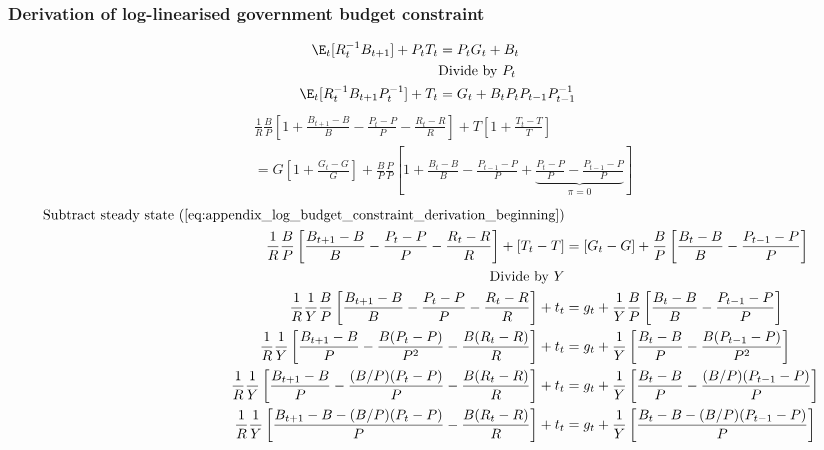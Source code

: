 \subsubsection{Derivation of log-linearised government budget constraint}
\begin{align} \label{eq:appendix_log_budget_constraint_derivation_beginning}
    \E_t [R^{-1}_tB_{t+1}] + P_t T_t &= P_tG_t + B_t\\
    &\text{Divide by $P_t$} \nonumber\\
    \E_t [R^{-1}_tB_{t+1}P_t^{-1}] + T_t &= G_t + B_tP_t P_{t-1} P^{-1}_{t-1}
\end{align} 
\begin{align}   
    &\frac{1}{R}\frac{B}{P}\left[ 1 + \frac{B_{t+1}-B}{B} - \frac{P_t - P}{P} - \frac{R_t-R}{R}\right] + T\left[ 1 + \frac{T_t - T}{T} \right] \nonumber \\ 
    &= G\left[ 1 + \frac{G_t - G}{G} \right] + \frac{B}{P} \frac{P}{P} \left[ 1 + \frac{B_t - B}{B} - \frac{P_{t-1} - P}{P} + \underbrace{\frac{P_{t} - P}{P} - \frac{P_{t-1} - P}{P}}_{\pi = 0}\right]
\end{align}
\begin{align}
    \text{Subtract steady state (\ref{eq:appendix_log_budget_constraint_derivation_beginning})}\nonumber \\
    \frac{1}{R}\frac{B}{P}\left[\frac{B_{t+1}-B}{B} - \frac{P_t - P}{P} - \frac{R_t-R}{R}\right] + \left[T_t - T \right] &= \left[G_t - G \right] + \frac{B}{P} \left[\frac{B_t - B}{B} - \frac{P_{t-1} - P}{P}\right]\\
    \text{Divide by $Y$} \nonumber\\
    \frac{1}{R}\frac{1}{Y}\frac{B}{P}\left[\frac{B_{t+1}-B}{B} - \frac{P_t - P}{P} - \frac{R_t-R}{R}\right] + t_t &= g_t + \frac{1}{Y}\frac{B}{P} \left[\frac{B_t - B}{B} - \frac{P_{t-1} - P}{P}\right]\\
    \frac{1}{R}\frac{1}{Y}\left[\frac{B_{t+1}-B}{P} - \frac{B(P_t - P)}{P^{2}} - \frac{B(R_t-R)}{R}\right] + t_t &= g_t + \frac{1}{Y} \left[\frac{B_t-B}{P} - \frac{B(P_{t-1} - P)}{P^{2}}\right]\\
    \frac{1}{R}\frac{1}{Y}\left[\frac{B_{t+1}-B}{P} - \frac{(B/P)(P_t - P)}{P} - \frac{B(R_t-R)}{R}\right] + t_t &= g_t + \frac{1}{Y} \left[\frac{B_t-B}{P} - \frac{(B/P)(P_{t-1} - P)}{P}\right]\\
    \frac{1}{R}\frac{1}{Y}\left[\frac{B_{t+1}-B - (B/P)(P_t - P)}{P} - \frac{B(R_t-R)}{R}\right] + t_t &= g_t + \frac{1}{Y} \left[\frac{B_{t}-B - (B/P)(P_{t-1} - P)}{P}\right]
\end{align}
